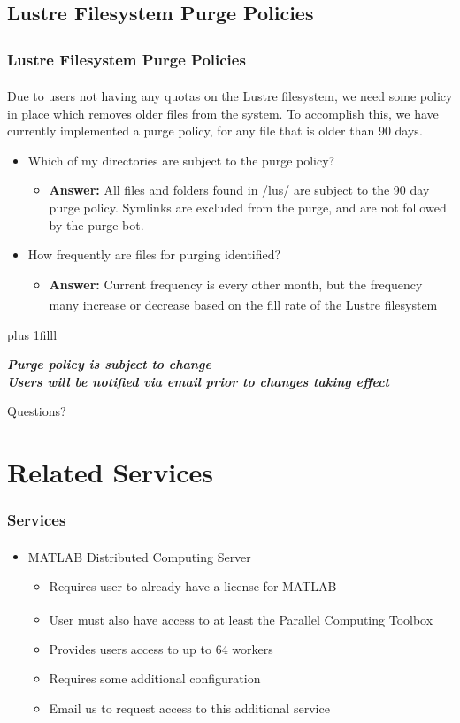 \documentclass[t,hyperref={pdfpagelabels=false}]{beamer}
\newcommand{\ctilde}{{\fontfamily{ptm}\selectfont\texttildelow}}
\newcommand{\trademark}{\fontsize{5}{6}\selectfont \textsuperscript{\texttrademark}}
\newcommand{\regtrademark}{\fontsize{5}{6}\selectfont \textsuperscript{\textregistered}}
\newcommand{\btVFill}{\vskip0pt plus 1filll}
\newcommand{\lustre}{Lustre{\regtrademark}}
\begin{document}
\subsection{Lustre Filesystem Purge Policies}
\begin{frame}
\frametitle{{\lustre} Filesystem Purge Policies}
Due to users not having any quotas on the {\lustre} filesystem, we need some policy in place which removes older files from the system.  To accomplish this, we have currently implemented a purge policy, for any file that is older than 90 days.
\begin{itemize}
 \item Which of my directories are subject to the purge policy?
   \begin{itemize}
   \item \textbf{Answer:} All files and folders found in \ctilde/lus/ are subject to the 90 day purge policy.  Symlinks are excluded from the purge, and are not followed by the purge bot.  
   \end{itemize}
\item How frequently are files for purging identified?
   \begin{itemize}
   \item \textbf{Answer:} Current frequency is every other month, but the frequency many increase or decrease based on the fill rate of the {\lustre} filesystem 
	\end{itemize}
\end{itemize}
\btVFill
\begin{center}
\footnotesize \textbf{\emph{Purge policy is subject to change~\\Users will be notified via email prior to changes taking effect}}
\end{center}
\end{frame}


\begin{frame}
\Huge{\centerline{Questions?}}
\end{frame}


\section{Related Services}
\begin{frame}
\frametitle{Services}
\begin{itemize}
\item MATLAB Distributed Computing Server{\trademark}
  \begin{itemize}
    \item Requires user to already have a license for MATLAB
    \item User must also have access to at least the Parallel Computing Toolbox{\trademark}
    \item Provides users access to up to 64 workers
    \item Requires some additional configuration
    \item Email us to request access to this additional service
  \end{itemize}
\end{itemize}
\end{frame}
\end{document}
